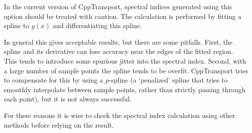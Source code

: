 \documentclass[11pt,a4paper]{article}
\newenvironment{warning}{\begin{tcolorbox}[enhanced,breakable,colback=red!10,colbacktitle=red!20,colframe=red!40,coltitle=black,title={Warning},fonttitle=\sffamily\fontseries{b}\selectfont]}{\end{tcolorbox}}
\newcommand{\packagefont}{\sffamily}
\newcommand{\CppTransport}{{\packagefont CppTransport}}
\begin{document}
\begin{warning}
    In the current version of {\CppTransport},
    spectral indices generated using this option should be treated
    with caution.
    The calculation is performed by fitting a spline to $y(x)$
    and differentiating this spline.

    In general this gives acceptable results, but there are some pitfalls.
    First, the spline and its derivative can lose accuracy near the edges of the
    fitted region.
    This tends to introduce some spurious jitter into the spectral index.
    Second, with a large number of sample points the spline tends to
    be overfit. {\CppTransport} tries to compensate for this by using a
    $p$-spline (a `penalized' spline that tries to smoothly interpolate
    between sample points, rather than strictly passing through each point),
    but it is not always successful.
    
    For these reasons it is wise to check the spectral index calculation using
    other methods before relying on the result.
\end{warning}
\end{document}
